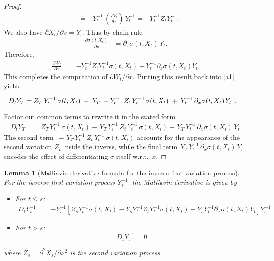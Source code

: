 \documentclass[]{interact}
\newcommand{\1}{\mathbf{1}}
\theoremstyle{plain}%
\newtheorem{lemma}[theorem]{Lemma}
\theoremstyle{definition}
\theoremstyle{remark}
\numberwithin{equation}{section}
\begin{document}
\begin{proof}
\begin{align*}
&= -Y_t^{-1}\,\left(\frac{\partial Y_t}{\partial x}\right)\,Y_t^{-1}
= -Y_t^{-1}Z_tY_t^{-1}.
\end{align*}
%
We also have \(\partial X_t/\partial x = Y_t\). Thus by chain rule
\begin{align*}
\frac{\partial \sigma(t, X_t)}{\partial x}
&= \partial_x \sigma(t, X_t)\,Y_t.
\end{align*}
Therefore,
\begin{align*}
\frac{\partial W_t}{\partial x}
&= -Y_t^{-1}Z_tY_t^{-1}\sigma(t, X_t)+
   Y_t^{-1}\partial_x \sigma(t, X_t)Y_t.
\end{align*}
This completes the computation of \(\partial W_t/\partial x\). Putting this result back 
into \eqref{a1} yields
\begin{align*}
D_t Y_T
&= Z_T\,Y_t^{-1}\,\sigma(t, X_t)
   \;+\;
   Y_T\Bigl[
        -\,Y_t^{-1}\,Z_t\,Y_t^{-1}\,\sigma(t, X_t)
        \;+\;
        Y_t^{-1}\,\partial_x \sigma(t, X_t)\,Y_t
       \Bigr].
\end{align*}
Factor out common terms to rewrite it in the stated form
\begin{align*}
D_t Y_T = &\,Z_T\,Y_t^{-1}\,\sigma(t, X_t) -\, Y_T\,Y_t^{-1}\,Z_t\,Y_t^{-1}\,\sigma(t, X_t) 
+\, Y_T\,Y_t^{-1}\,\partial_x \sigma(t, X_t)\,Y_t.
\end{align*}
The second term \(\,-\,Y_T\,Y_t^{-1}\,Z_t\,Y_t^{-1}\,\sigma(t, X_t)\)  
accounts for the appearance of the second variation \(Z_t\) inside the inverse, 
while the final term 
\(\,Y_T\,Y_t^{-1}\,\partial_x \sigma(t, X_t)\,Y_t\)
encodes the effect of differentiating \(\sigma\) itself w.r.t.\ \(x\).

\end{proof}



\begin{lemma}[Malliavin derivative formula for the inverse first variation process]
\label{lemma:DtYs_inverse}
For the inverse first variation process \( Y_s^{-1} \), the Malliavin derivative is given by
\begin{itemize}
    \item For \( t \leq s \):
    \begin{align*}
    D_t Y_s^{-1} &= - Y_s^{-1} \left[ Z_s Y_t^{-1} \sigma(t, X_t) - Y_s Y_t^{-1} Z_t Y_t^{-1} \sigma(t, X_t) + Y_s Y_t^{-1} \partial_x \sigma(t, X_t) Y_t \right] Y_s^{-1}
    \end{align*}
    \item For \( t > s \):
    \[
    D_t Y_s^{-1} = 0
    \]
\end{itemize}
where \( Z_s = \partial^2 X_s/\partial x^2 \) is the second variation process.
\end{lemma}
\end{document}
